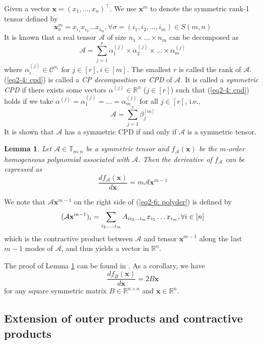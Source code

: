 \documentclass[11pt, oneside]{article}  %
\newtheorem{lem}[thm]{Lemma}
\newcommand{\al}{\alpha}
\newcommand{\be}{\beta}
\newcommand{\si}{\sigma}
\newcommand{\RR}{\mathbb{R}}
\newcommand{\TT}{\mathbb{T}}
\newcommand{\A}{\mathcal{A}}
\newcommand{\C}{\mathcal{C}}
\newcommand{\bx}{\textbf{x}}
\newcommand{\beq}{\begin{equation}}
\newcommand{\eeq}{\end{equation}}
\begin{document}
Given a vector $\bx=(x_1,\ldots, x_n)^{\top}$. We use $\bx^{m}$ to denote the symmetric rank-1 tensor defined by 
\[ 
\bx^{m}_{\si}=x_{i_1}x_{i_2}\ldots x_{i_m},\forall \si=(i_1,i_2,\ldots,i_m)\in S(m,n) \] 
It is known\cite{cglm08} that a real tensor $\A$ of size $n_1\times\ldots \times n_m$ can be decomposed as
\beq\label{eq2-4: cpd}
\A=\sum\limits_{j=1}^r \al_1^{(j)}\times \al_2^{(j)}\times \ldots \times \al_m^{(j)}
\eeq 
where $\al_i^{(j)}\in\C^{n_i}$ for $j\in [r],i\in [m]$. The smallest $r$ is called the rank of $\A$. (\ref{eq2-4: cpd}) is called a \emph{CP 
decomposition} or \emph{CPD} of $\A$.  It is called a \emph{symmetric CPD} if  there exists some vectors $\al^{(j)}\in\RR^{n}$ 
($j\in [r]$) such that (\ref{eq2-4: cpd}) holds if we take $\al^{(j)}=\al_1^{(j)}=\ldots =\al_m^{(j)}$ for all $j\in [r]$, i.e., 
\beq\label{eq2-5: symcpd}
\A = \sum\limits_{j=1}^r \be_j^{[m]} 
\eeq 
It is shown that $\A$ has a symmetric CPD if and only if $\A$ is a symmetric tensor\cite{cglm08}.\\  

\begin{lem}\label{le2-1}
Let $\A\in\TT_{m;n}$ be a symmetric tensor and $f_{\A}(\bx)$ be the $m$-order homogeneous polynomial associated with $\A$. Then
the derivative of $f_{\A}$ can be expressed as 
\beq\label{eq2-6: polyder}
 \frac{d f_{\A}(\bx)}{d \bx} = m \A\bx^{m-1}
\eeq  
\end{lem}
We note that $\A\bx^{m-1}$ on the right side of (\ref{eq2-6: polyder}) is defined by 
\beq\label{eq2-7:y=Ax^{m-1}}
(\A\bx^{m-1})_{i} = \sum_{i_{2},\ldots,i_{m}} A_{i i_{2}\ldots i_{m}}x_{i_{2}}\ldots x_{i_{m}}, \forall i\in [n]  
\eeq
which is the contractive product between $\A$ and tensor $\bx^{m-1}$ along the last $m-1$ modes of $\A$, and thus yields a vector in $\RR^{n}$.  

The proof of Lemma \ref{le2-1} can be found in \cite{QL2017}. As a corollary, we have  
\beq\label{eq2-7: quadder}
\frac{d f_{B}(\bx)}{d\bx} = 2B\bx
\eeq
for any square symmetric matrix $B\in\RR^{n\times n}$ and $\bx\in\RR^{n}$. 

\subsection{Extension of outer products and contractive products}
\label{sec2-2}
\setcounter{equation}{0} 
\end{document}
